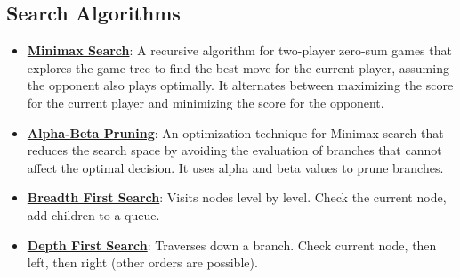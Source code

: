 \documentclass{article}%
\begin{document}
%
\subsection{Search Algorithms}%
\label{subsec:SearchAlgorithms}%
\begin{itemize}[leftmargin=*]%
\item \href{https://purdue.brightspace.com/d2l/common/assets/pdfjs-d2l-dist/1.0.14-legacy/web/viewer.html?file=%2Fcontent%2Fenforced%2F1095467-wl.202510.CS.24300.001%2F02L2-Intro.pdf%3Fou%3D1095467&lang=en-us&container=d2l-fileviewer-rendered-pdf&fullscreen=d2l-fileviewer-rendered-pdf-dialog&height=667#page=22}{\textbf{Minimax Search}}: A recursive algorithm for two-player zero-sum games that explores the game tree to find the best move for the current player, assuming the opponent also plays optimally. It alternates between maximizing the score for the current player and minimizing the score for the opponent.%
\item \href{https://purdue.brightspace.com/d2l/common/assets/pdfjs-d2l-dist/1.0.14-legacy/web/viewer.html?file=%2Fcontent%2Fenforced%2F1095467-wl.202510.CS.24300.001%2F02L2-Intro.pdf%3Fou%3D1095467&lang=en-us&container=d2l-fileviewer-rendered-pdf&fullscreen=d2l-fileviewer-rendered-pdf-dialog&height=667#page=23}{\textbf{Alpha-Beta Pruning}}: An optimization technique for Minimax search that reduces the search space by avoiding the evaluation of branches that cannot affect the optimal decision. It uses alpha and beta values to prune branches.%
\item \href{https://purdue.brightspace.com/d2l/common/assets/pdfjs-d2l-dist/1.0.14-legacy/web/viewer.html?file=%2Fcontent%2Fenforced%2F1095467-wl.202510.CS.24300.001%2F14L1-DepthFS.pdf%3Fou%3D1095467&lang=en-us&container=d2l-fileviewer-rendered-pdf&fullscreen=d2l-fileviewer-rendered-pdf-dialog&height=667#page=8}{\textbf{Breadth First Search}}: Visits nodes level by level. Check the current node, add children to a queue.%
\item \href{https://purdue.brightspace.com/d2l/common/assets/pdfjs-d2l-dist/1.0.14-legacy/web/viewer.html?file=%2Fcontent%2Fenforced%2F1095467-wl.202510.CS.24300.001%2F14L1-DepthFS.pdf%3Fou%3D1095467&lang=en-us&container=d2l-fileviewer-rendered-pdf&fullscreen=d2l-fileviewer-rendered-pdf-dialog&height=667#page=8}{\textbf{Depth First Search}}: Traverses down a branch. Check current node, then left, then right (other orders are possible).%
\end{itemize}

%
\end{document}
